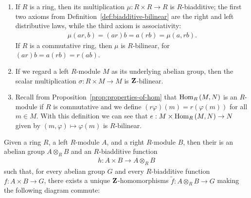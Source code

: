     \begin{example}
        \phantom{a}
        \begin{enumerate}[label = (\arabic*)]
            \item If $R$ is a ring, then its multiplication $\mu:R \times R \rightarrow R$ is $R$-biadditive; the first two axioms from Definition~\ref{def:biadditive-bilinear} are the right and left distributive laws, while the third axiom is associativity:
                \begin{equation*}
                \begin{split}
                    \mu(ar,b)=(ar)b=a(rb)=\mu(a,rb).
                \end{split}
                \end{equation*}
            If $R$ is a commutative ring, then $\mu$ is $R$-bilinear, for $(ar)b=a(rb)=r(ab)$.

            \item If we regard a left $R$-module $M$ as its underlying abelian group, then the scalar multiplication $\sigma: R \times M \rightarrow M$ is $\mathbf{Z}$-bilinear.

            \item Recall from Proposition~\ref{prop:properties-of-hom} that $\operatorname{Hom}_R{(M,N)}$ is an $R$-module if $R$ is commutative and we define $(r\varphi)(m)=r(\varphi(m))$ for all $m \in M$. With this definition we can see that  $e:M \times \operatorname{Hom}_R{(M,N)} \rightarrow N$ given by $(m,\varphi) \mapsto \varphi(m)$ is $R$-bilinear.
        \end{enumerate}
    \end{example}

    \begin{definition}\label{def:tensor-product}
        Given a ring $R$, a left $R$-module $A$, and a right $R$-module $B$, then their  is an abelian group $A \otimes_R B$ and an $R$-biadditive function
            \begin{equation*}
            \begin{split}
                h:A \times B \rightarrow A \otimes_R B
            \end{split}
            \end{equation*}
        such that, for every abelian group $G$ and every $R$-biadditive function $f:A \times B \rightarrow G$, there exists a unique $\mathbf{Z}$-homomorphisms $\tilde{f}:A \otimes_R B \rightarrow G$ making the following diagram commute:
            \begin{center}
            \end{center}
    \end{definition}

